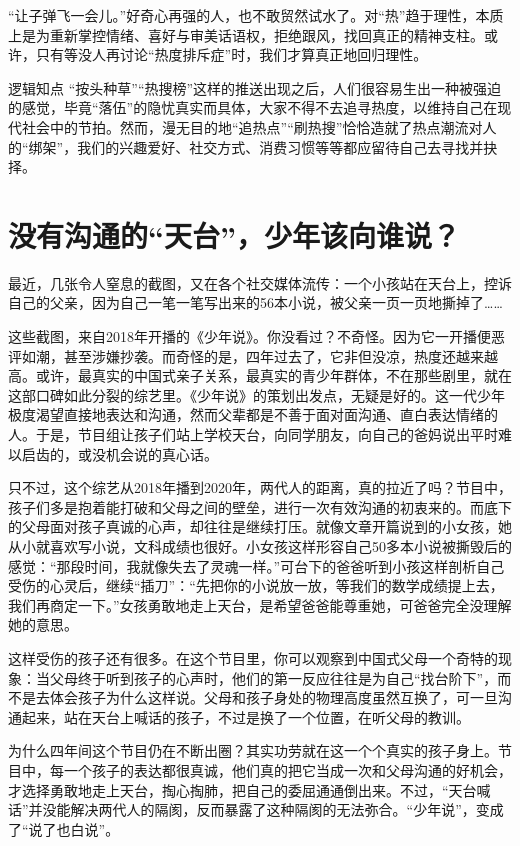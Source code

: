 “让子弹飞一会儿。”好奇心再强的人，也不敢贸然试水了。对“热”趋于理性，本质上是为重新掌控情绪、喜好与审美话语权，拒绝跟风，找回真正的精神支柱。或许，只有等没人再讨论“热度排斥症”时，我们才算真正地回归理性。

\begin{quoteBox}{逻辑知点}
“按头种草”“热搜榜”这样的推送出现之后，人们很容易生出一种被强迫的感觉，毕竟“落伍”的隐忧真实而具体，大家不得不去追寻热度，以维持自己在现代社会中的节拍。然而，漫无目的地“追热点”“刷热搜”恰恰造就了热点潮流对人的“绑架”，我们的兴趣爱好、社交方式、消费习惯等等都应留待自己去寻找并抉择。
\end{quoteBox}

\clearpage
\section*{没有沟通的“天台”，少年该向谁说？}

最近，几张令人窒息的截图，又在各个社交媒体流传：一个小孩站在天台上，控诉自己的父亲，因为自己一笔一笔写出来的56本小说，被父亲一页一页地撕掉了……

这些截图，来自2018年开播的《少年说》。你没看过？不奇怪。因为它一开播便恶评如潮，甚至涉嫌抄袭。而奇怪的是，四年过去了，它非但没凉，热度还越来越高。或许，最真实的中国式亲子关系，最真实的青少年群体，不在那些剧里，就在这部口碑如此分裂的综艺里。《少年说》的策划出发点，无疑是好的。这一代少年极度渴望直接地表达和沟通，然而父辈都是不善于面对面沟通、直白表达情绪的人。于是，节目组让孩子们站上学校天台，向同学朋友，向自己的爸妈说出平时难以启齿的，或没机会说的真心话。

只不过，这个综艺从2018年播到2020年，两代人的距离，真的拉近了吗？节目中，孩子们多是抱着能打破和父母之间的壁垒，进行一次有效沟通的初衷来的。而底下的父母面对孩子真诚的心声，却往往是继续打压。就像文章开篇说到的小女孩，她从小就喜欢写小说，文科成绩也很好。小女孩这样形容自己50多本小说被撕毁后的感觉：“那段时间，我就像失去了灵魂一样。”可台下的爸爸听到小孩这样剖析自己受伤的心灵后，继续“插刀”：“先把你的小说放一放，等我们的数学成绩提上去，我们再商定一下。”女孩勇敢地走上天台，是希望爸爸能尊重她，可爸爸完全没理解她的意思。

这样受伤的孩子还有很多。在这个节目里，你可以观察到中国式父母一个奇特的现象：当父母终于听到孩子的心声时，他们的第一反应往往是为自己“找台阶下”，而不是去体会孩子为什么这样说。父母和孩子身处的物理高度虽然互换了，可一旦沟通起来，站在天台上喊话的孩子，不过是换了一个位置，在听父母的教训。

为什么四年间这个节目仍在不断出圈？其实功劳就在这一个个真实的孩子身上。节目中，每一个孩子的表达都很真诚，他们真的把它当成一次和父母沟通的好机会，才选择勇敢地走上天台，掏心掏肺，把自己的委屈通通倒出来。不过，“天台喊话”并没能解决两代人的隔阂，反而暴露了这种隔阂的无法弥合。“少年说”，变成了“说了也白说”。

